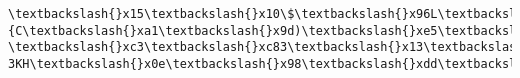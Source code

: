 \documentclass[11pt]{article}
\begin{document}
\begin{Verbatim}[commandchars=\\\{\}]
\textbackslash{}x15\textbackslash{}x10\$\textbackslash{}x96L\textbackslash{}xbe/\textbackslash{}x9a\textbackslash{}xa2\textbackslash{}x14\textbackslash{}x03\textbackslash{}xdc\{C\textbackslash{}xa1\textbackslash{}x9d)\textbackslash{}xe5\textbackslash{}x0f\textbackslash{}x0b@o\textbackslash{}xf2\textbackslash{}x8d\textbackslash{}x05\textbackslash{}x81"\textbackslash{}x16\textbackslash{}xce\textbackslash{}x05>4\textbackslash{}xdb\textbackslash{}xdf\textbackslash{}xdf\textbackslash{}xc7\textbackslash{}xd39\textbackslash{}xc8\textbackslash{}xc4Rp\textbackslash{}x17\textbackslash{}x18\textbackslash{}x00\textbackslash{}x93\textbackslash{}xdc\textbackslash{}xaa\textbackslash{}xe4\textbackslash{}xcc\#@*\textbackslash{}xca\textbackslash{}x08\textbackslash{}x00\textbackslash{}xa0\textbackslash{}xe6\textbackslash{}n;7\textbackslash{}xa91W@\&\$\textbackslash{}x15\textbackslash{}x1d\textbackslash{}x8c\textbackslash{}n\textbackslash{}x90\textbackslash{}xc2|h\textbackslash{}xc8\textbackslash{}xcf\textbackslash{}xf1t\textbackslash{}xfe\textbackslash{}x11ph\textbackslash{}xb6F\textbackslash{}xea\textbackslash{}x84;\textbackslash{}xe3\textbackslash{}xc0\textbackslash{}xaa@e;\textbackslash{}xa8\textbackslash{}x10\textbackslash{}xb9\}\textbackslash{}x19\textbackslash{}tv\textbackslash{}x05\textbackslash{}x8c\textbackslash{}x89W\%\textbackslash{}x9c\textbackslash{}xc4\textbackslash{}xecSvH-\textbackslash{}xc3\textbackslash{}xc83\textbackslash{}x13\textbackslash{}xaf\textbackslash{}x08\textbackslash{}xc2\textbackslash{}x16\textbackslash{}xa3\textbackslash{}x85\textbackslash{}xc8:\textbackslash{}xc8\textbackslash{}r\}nY\textbackslash{}x9e\textbackslash{}xad\textbackslash{}x14s\textbackslash{}xf7\textbackslash{}x04\textbackslash{}xcc\textbackslash{}xd9\textbackslash{}x88\textbackslash{}xb8y\textbackslash{}xc0)\textbackslash{}xc1\textbackslash{}xdc-3KH\textbackslash{}x0e\textbackslash{}x98\textbackslash{}xdd\textbackslash{}xea\textbackslash{}xba6\textbackslash{}x93\textbackslash{}x90\textbackslash{}xec\textbackslash{}xcfd+;\textbackslash{}x0fP\textbackslash{}xc6Zk\textbackslash{}xaeh 
\end{Verbatim}
\end{document}

